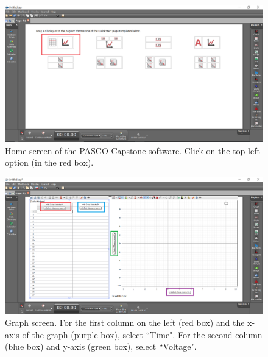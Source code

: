 \documentclass[12pt]{report}
\begin{document}
\begin{enumerate}
\begin{figure}[H]
\centering
\includegraphics[width=\textwidth]{lab2-pasco-open-interface}
\caption{Home screen of the PASCO Capstone software. Click on the top left option (in the red box).}
\label{Fig:lab2-pasco-home-ui}
\end{figure}
\begin{figure}[h]
\centering
\includegraphics[width=\textwidth]{lab2-pasco-graph-interface}
\caption{Graph screen. For the first column on the left (red box) and the x-axis of the graph (purple box), select ``Time". For the second column (blue box) and y-axis (green box), select ``Voltage".}
\label{Fig:lab2-pasco-graph-ui}
\end{figure}


\end{enumerate}
\end{document}
